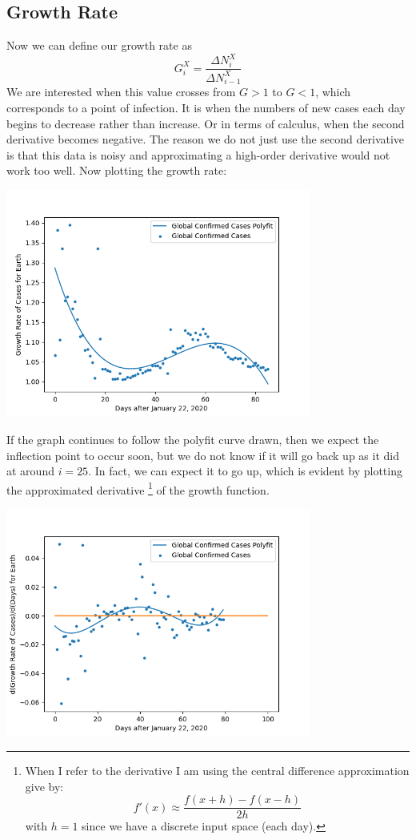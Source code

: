\documentclass{report}
\begin{document}
        \subsection{Growth Rate}
            Now we can define our growth rate as 
            \begin{equation}
                G^X_i = \dfrac{\Delta N^X_i}{\Delta N^X_{i - 1}}
            \end{equation}
            We are interested when this value crosses from $G > 1$ to $G < 1$, which corresponds to a point of infection. It is when the numbers of new cases each day begins to decrease rather than increase. Or in terms of calculus, when the second derivative becomes negative. The reason we do not just use the second derivative is that this data is noisy and approximating a high-order derivative would not work too well. Now plotting the growth rate:
            \begin{center}
                \includegraphics[width=10cm]{plots/global/growth_rate.png}
            \end{center}
            If the graph continues to follow the polyfit curve drawn, then we expect the inflection point to occur soon, but we do not know if it will go back up as it did at around $i = 25$. In fact, we can expect it to go up, which is evident by plotting the approximated derivative
            \footnote{
                When I refer to the derivative I am using the central difference approximation give by:
                $$f'(x) \approx \dfrac{f(x + h) - f(x - h)}{2h}$$
                with $h = 1$ since we have a discrete input space (each day).
            } of the growth function.
            \begin{center}
                \includegraphics[width=10cm]{plots/global/growth_rate_derivative.png}
            \end{center} 
\end{document}
